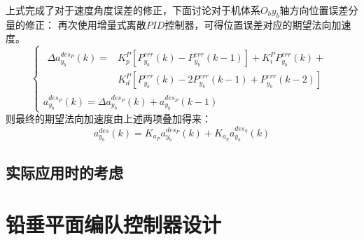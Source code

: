 上式完成了对于速度角度误差的修正，下面讨论对于机体系$O_by_b$轴方向位置误差分量的修正：
再次使用增量式离散$PID$控制器，可得位置误差对应的期望法向加速度。
\begin{equation}
    \left\{
        \begin{array}{l}
    \begin{aligned}
        \Delta a_{y_b}^{des_{P}}(k)=&K_{p}^{P}[P_{y_b}^{err}(k)-P_{y_b}^{err}(k-1)]+K_{i}^{P}P_{y_b}^{err}(k)+\\
        &K_{d}^{P}[P_{y_b}^{err}(k)-2P_{y_b}^{err}(k-1)+P_{y_b}^{err}(k-2)]
        \end{aligned}\\
        a_{y_b}^{des_{P}}(k)=\Delta a_{y_b}^{des_{P}}(k)+a_{y_b}^{des_{P}}(k-1)
\end{array}
\right .
    \label{xb_pos_controller}
\end{equation}
则最终的期望法向加速度由上述两项叠加得来：
\begin{equation}
    a_{y_b}^{des}(k)=K_{a_P}a_{y_b}^{des_{P}}(k)+K_{a_{\eta}}a_{y_b}^{des_{\eta}}(k)
\end{equation}
\subsection{实际应用时的考虑}

\section{铅垂平面编队控制器设计}
